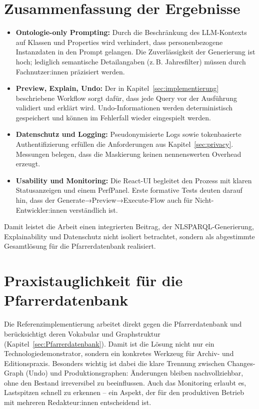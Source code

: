 \section{Zusammenfassung der Ergebnisse}
\begin{itemize}
  \item \textbf{Ontologie-only Prompting:} Durch die Beschränkung des LLM-Kontexts auf Klassen und Properties wird verhindert, dass personenbezogene Instanzdaten in den Prompt gelangen. Die Zuverlässigkeit der Generierung ist hoch; lediglich semantische Detailangaben (z.\,B. Jahresfilter) müssen durch Fachnutzer:innen präzisiert werden.
  \item \textbf{Preview, Explain, Undo:} Der in Kapitel~\ref{sec:implementierung} beschriebene Workflow sorgt dafür, dass jede Query vor der Ausführung validiert und erklärt wird. Undo-Informationen werden deterministisch gespeichert und können im Fehlerfall wieder eingespielt werden.
  \item \textbf{Datenschutz und Logging:} Pseudonymisierte Logs sowie tokenbasierte Authentifizierung erfüllen die Anforderungen aus Kapitel~\ref{sec:privacy}. Messungen belegen, dass die Maskierung keinen nennenswerten Overhead erzeugt.
  \item \textbf{Usability und Monitoring:} Die React-UI begleitet den Prozess mit klaren Statusanzeigen und einem PerfPanel. Erste formative Tests deuten darauf hin, dass der Generate→Preview→Execute-Flow auch für Nicht-Entwickler:innen verständlich ist.
\end{itemize}
Damit leistet die Arbeit einen integrierten Beitrag, der NL{\textrightarrow}SPARQL-Generierung, Explainability und Datenschutz nicht isoliert betrachtet, sondern als abgestimmte Gesamtlösung für die Pfarrerdatenbank realisiert.

\section{Praxistauglichkeit für die Pfarrerdatenbank}
Die Referenzimplementierung arbeitet direkt gegen die Pfarrerdatenbank und berücksichtigt deren Vokabular und Graphstruktur (Kapitel~\ref{sec:Pfarrerdatenbank}). Damit ist die Lösung nicht nur ein Technologiedemonstrator, sondern ein konkretes Werkzeug für Archiv- und Editionspraxis. Besonders wichtig ist dabei die klare Trennung zwischen Changes-Graph (Undo) und Produktionsgraphen: Änderungen bleiben nachvollziehbar, ohne den Bestand irreversibel zu beeinflussen. Auch das Monitoring erlaubt es, Lastspitzen schnell zu erkennen – ein Aspekt, der für den produktiven Betrieb mit mehreren Redakteur:innen entscheidend ist.

